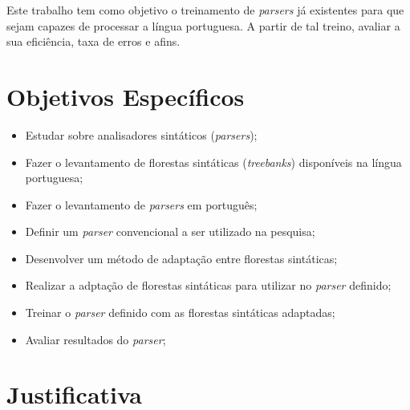 Este trabalho tem como objetivo o treinamento de \textit{parsers} já existentes para que sejam capazes de processar a língua portuguesa. A partir de tal treino, avaliar a sua eficiência, taxa de erros e afins.

\section{Objetivos Específicos}\label{sec:objetivos-especificos}
\begin{itemize}
    \item Estudar sobre analisadores sintáticos (\textit{parsers});
    \item Fazer o levantamento de florestas sintáticas (\textit{treebanks}) disponíveis na língua portuguesa;
    \item Fazer o levantamento de \textit{parsers} em português;
    \item Definir um \textit{parser} convencional a ser utilizado na pesquisa;
    \item Desenvolver um método de adaptação entre florestas sintáticas; 
    \item Realizar a adptação de florestas sintáticas para utilizar no \textit{parser} definido;
    \item Treinar o \textit{parser} definido com as florestas sintáticas adaptadas;
    \item Avaliar resultados do \textit{parser};
    
\end{itemize}

\section{Justificativa}	
\label{justificativa}


